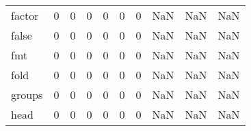 \begin{tabular}{lrrrrrrrrr}
factor    &                                       0 &                                                  0 &                                                  0 &                                                  0 &                                                  0 &                                                  0 &                                                NaN &                                    NaN &                                  NaN \\
false     &                                       0 &                                                  0 &                                                  0 &                                                  0 &                                                  0 &                                                  0 &                                                NaN &                                    NaN &                                  NaN \\
fmt       &                                       0 &                                                  0 &                                                  0 &                                                  0 &                                                  0 &                                                  0 &                                                NaN &                                    NaN &                                  NaN \\
fold      &                                       0 &                                                  0 &                                                  0 &                                                  0 &                                                  0 &                                                  0 &                                                NaN &                                    NaN &                                  NaN \\
groups    &                                       0 &                                                  0 &                                                  0 &                                                  0 &                                                  0 &                                                  0 &                                                NaN &                                    NaN &                                  NaN \\
head      &                                       0 &                                                  0 &                                                  0 &                                                  0 &                                                  0 &                                                  0 &                                                NaN &                                    NaN &                                  NaN \\

\end{tabular}
